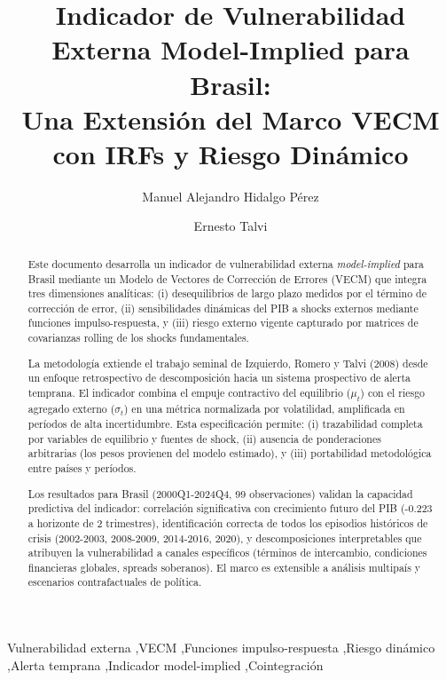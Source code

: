 \documentclass[3p,11pt,draft,natbib=false]{elsarticle}
\begin{document}
\begin{frontmatter}

\title{Indicador de Vulnerabilidad Externa Model-Implied para Brasil: \\ 
Una Extensión del Marco VECM con IRFs y Riesgo Dinámico}

\author[inst1]{Manuel Alejandro Hidalgo Pérez}

\author[inst1]{Ernesto Talvi}

\address[inst1]{Real Instituto Elcano, Madrid, España}

\begin{abstract}
Este documento desarrolla un indicador de vulnerabilidad externa \emph{model-implied} para Brasil mediante un Modelo de Vectores de Corrección de Errores (VECM) que integra tres dimensiones analíticas: (i) desequilibrios de largo plazo medidos por el término de corrección de error, (ii) sensibilidades dinámicas del PIB a shocks externos mediante funciones impulso-respuesta, y (iii) riesgo externo vigente capturado por matrices de covarianzas rolling de los shocks fundamentales. 

La metodología extiende el trabajo seminal de Izquierdo, Romero y Talvi (2008) desde un enfoque retrospectivo de descomposición hacia un sistema prospectivo de alerta temprana. El indicador combina el empuje contractivo del equilibrio (\(\mu_t\)) con el riesgo agregado externo (\(\sigma_t\)) en una métrica normalizada por volatilidad, amplificada en períodos de alta incertidumbre. Esta especificación permite: (i) trazabilidad completa por variables de equilibrio y fuentes de shock, (ii) ausencia de ponderaciones arbitrarias (los pesos provienen del modelo estimado), y (iii) portabilidad metodológica entre países y períodos.

Los resultados para Brasil (2000Q1-2024Q4, 99 observaciones) validan la capacidad predictiva del indicador: correlación significativa con crecimiento futuro del PIB (-0.223 a horizonte de 2 trimestres), identificación correcta de todos los episodios históricos de crisis (2002-2003, 2008-2009, 2014-2016, 2020), y descomposiciones interpretables que atribuyen la vulnerabilidad a canales específicos (términos de intercambio, condiciones financieras globales, spreads soberanos). El marco es extensible a análisis multipaís y escenarios contrafactuales de política.
\end{abstract}

\begin{keyword}
Vulnerabilidad externa \sep VECM \sep Funciones impulso-respuesta \sep Riesgo dinámico \sep Alerta temprana \sep Indicador model-implied \sep Cointegración
\end{keyword}

\end{frontmatter}
\end{document}
